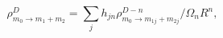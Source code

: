 \begin{equation}
 \rho^D_{m_0\rightarrow m_1+m_2} = \sum_{j} h_{jn}
 \rho^{D-n}_{m_0\rightarrow m_{1j}+m_{2j}}/\Omega_nR^n,
\end{equation}

